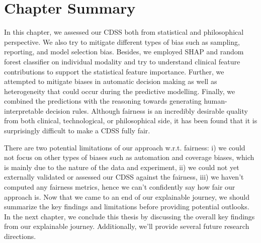 \section{Chapter Summary}\label{chapter_9:conclusion}
In this chapter, we assessed our CDSS both from statistical and philosophical perspective. We also try to mitigate different types of bias such as sampling, reporting, and model selection bias. Besides, we employed SHAP and random forest classifier on individual modality and try to understand clinical feature contributions to support the statistical feature importance. Further, we attempted to mitigate biases in automatic decision making as well as heterogeneity that could occur during the predictive modelling. Finally, we combined the predictions with the reasoning towards generating human-interpretable decision rules. Although fairness is an incredibly desirable quality from both clinical, technological, or philosophical side, it has been found that it is surprisingly difficult to make a CDSS fully fair. 

\hspace*{3.5mm} There are two potential limitations of our approach w.r.t. fairness: i) we could not focus on other types of biases such as automation and coverage biases, which is mainly due to the nature of the data and experiment, ii) we could not yet externally validated or assessed our CDSS against the fairness, iii) we haven't computed any fairness metrics, hence we can't confidently say how fair our approach is. Now that we came to an end of our explainable journey, we should summarize the key findings and limitations before providing potential outlooks. In the next chapter, we conclude this thesis by discussing the overall key findings from our explainable journey. Additionally, we'll provide several future research directions.  



